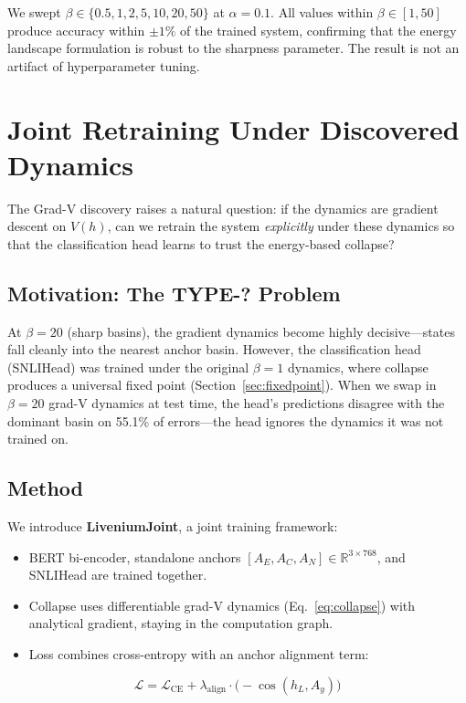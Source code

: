 \documentclass[11pt]{article}
\newcommand{\anchor}[1]{A_{#1}}
\newcommand{\R}{\mathbb{R}}
\begin{document}
We swept $\beta \in \{0.5, 1, 2, 5, 10, 20, 50\}$ at $\alpha = 0.1$.
All values within $\beta \in [1, 50]$ produce accuracy within $\pm 1\%$
of the trained system, confirming that the energy landscape formulation
is robust to the sharpness parameter. The result is not an artifact of
hyperparameter tuning.

\section{Joint Retraining Under Discovered Dynamics}
\label{sec:joint}

The Grad-V discovery raises a natural question: if the dynamics are
gradient descent on $V(h)$, can we retrain the system \emph{explicitly}
under these dynamics so that the classification head learns to trust the
energy-based collapse?

\subsection{Motivation: The TYPE-? Problem}

At $\beta=20$ (sharp basins), the gradient dynamics become highly
decisive---states fall cleanly into the nearest anchor basin. However,
the classification head (SNLIHead) was trained under the original
$\beta=1$ dynamics, where collapse produces a universal fixed point
(Section~\ref{sec:fixedpoint}). When we swap in $\beta=20$ grad-V
dynamics at test time, the head's predictions disagree with the
dominant basin on 55.1\% of errors---the head ignores the dynamics it
was not trained on.

\subsection{Method}

We introduce \textbf{LiveniumJoint}, a joint training framework:
\begin{itemize}
    \item BERT bi-encoder, standalone anchors $[\anchor{E}, \anchor{C}, \anchor{N}] \in \R^{3 \times 768}$, and SNLIHead are trained together.
    \item Collapse uses differentiable grad-V dynamics (Eq.~\ref{eq:collapse}) with analytical gradient, staying in the computation graph.
    \item Loss combines cross-entropy with an anchor alignment term:
\end{itemize}
\begin{equation}
\label{eq:joint_loss}
    \mathcal{L} = \mathcal{L}_{\text{CE}} + \lambda_{\text{align}} \cdot \big(-\cos(h_L, \anchor{y})\big)
\end{equation}
\end{document}
